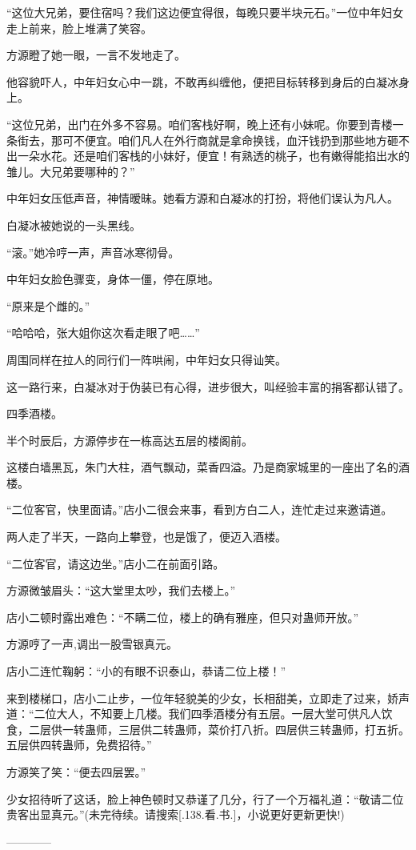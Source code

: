 \begin{this_body}
“这位大兄弟，要住宿吗？我们这边便宜得很，每晚只要半块元石。”一位中年妇女走上前来，脸上堆满了笑容。

方源瞪了她一眼，一言不发地走了。

他容貌吓人，中年妇女心中一跳，不敢再纠缠他，便把目标转移到身后的白凝冰身上。

“这位兄弟，出门在外多不容易。咱们客栈好啊，晚上还有小妹呢。你要到青楼一条街去，那可不便宜。咱们凡人在外行商就是拿命换钱，血汗钱扔到那些地方砸不出一朵水花。还是咱们客栈的小妹好，便宜！有熟透的桃子，也有嫩得能掐出水的雏儿。大兄弟要哪种的？”

中年妇女压低声音，神情暧昧。她看方源和白凝冰的打扮，将他们误认为凡人。

白凝冰被她说的一头黑线。

“滚。”她冷哼一声，声音冰寒彻骨。

中年妇女脸色骤变，身体一僵，停在原地。

“原来是个雌的。”

“哈哈哈，张大姐你这次看走眼了吧……”

周围同样在拉人的同行们一阵哄闹，中年妇女只得讪笑。

这一路行来，白凝冰对于伪装已有心得，进步很大，叫经验丰富的捐客都认错了。

四季酒楼。

半个时辰后，方源停步在一栋高达五层的楼阁前。

这楼白墙黑瓦，朱门大柱，酒气飘动，菜香四溢。乃是商家城里的一座出了名的酒楼。

“二位客官，快里面请。”店小二很会来事，看到方白二人，连忙走过来邀请道。

两人走了半天，一路向上攀登，也是饿了，便迈入酒楼。

“二位客官，请这边坐。”店小二在前面引路。

方源微皱眉头：“这大堂里太吵，我们去楼上。”

店小二顿时露出难色：“不瞒二位，楼上的确有雅座，但只对蛊师开放。”

方源哼了一声,调出一股雪银真元。

店小二连忙鞠躬：“小的有眼不识泰山，恭请二位上楼！”

来到楼梯口，店小二止步，一位年轻貌美的少女，长相甜美，立即走了过来，娇声道：“二位大人，不知要上几楼。我们四季酒楼分有五层。一层大堂可供凡人饮食，二层供一转蛊师，三层供二转蛊师，菜价打八折。四层供三转蛊师，打五折。五层供四转蛊师，免费招待。”

方源笑了笑：“便去四层罢。”

少女招待听了这话，脸上神色顿时又恭谨了几分，行了一个万福礼道：“敬请二位贵客出显真元。”(未完待续。请搜索[.138.看.书.]，小说更好更新更快!)

------------

\end{this_body}

